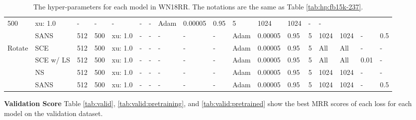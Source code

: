 \begin{table}[h!]
{\begin{tabular}{llllllllllllllllll}
  500 &
  xu: 1.0 &
  - &
  - &
  - &
  - &
  - &
  Adam &
  0.00005 &
  0.95 &
  5 &
  1024 &
  1024 &
  - &
  - \\
 &
  SANS &
  512 &
  500 &
  xu: 1.0 &
  - &
  - &
  - &
  - &
  - &
  Adam &
  0.00005 &
  0.95 &
  5 &
  1024 &
  1024 &
  - &
  0.5\\
  \midrule
\multirow{4}{*}{Rotate} &
  SCE &
  512 &
  500 &
  xu: 1.0 &
  - &
  - &
  - &
  - &
  - &
  Adam &
  0.00005 &
  0.95 &
  5 &
  All &
  All &
  - &
  - \\
 &
  SCE w/ LS &
  512 &
  500 &
  xu: 1.0 &
  - &
  - &
  - &
  - &
  - &
  Adam &
  0.00005 &
  0.95 &
  5 &
  All &
  All &
  0.01 &
  - \\
 &
  NS &
  512 &
  500 &
  xu: 1.0 &
  - &
  - &
  - &
  - &
  - &
  Adam &
  0.00005 &
  0.95 &
  5 &
  1024 &
  1024 &
  - &
  - \\
 &
  SANS &
  512 &
  500 &
  xu: 1.0 &
  - &
  - &
  - &
  - &
  - &
  Adam &
  0.00005 &
  0.95 &
  5 &
  1024 &
  1024 &
  - &
  0.5\\
  \bottomrule
\end{tabular}}
\caption{The hyper-parameters for each model in WN18RR. The notations are the same as Table \ref{tab:hp:fb15k-237}.}
\label{tab:hp:wn18rr}
\end{table}

\noindent\textbf{Validation Score} Table \ref{tab:valid}, \ref{tab:valid:pretraining}, and \ref{tab:valid:pretrained} show the best MRR scores of each loss for each model on the validation dataset.

